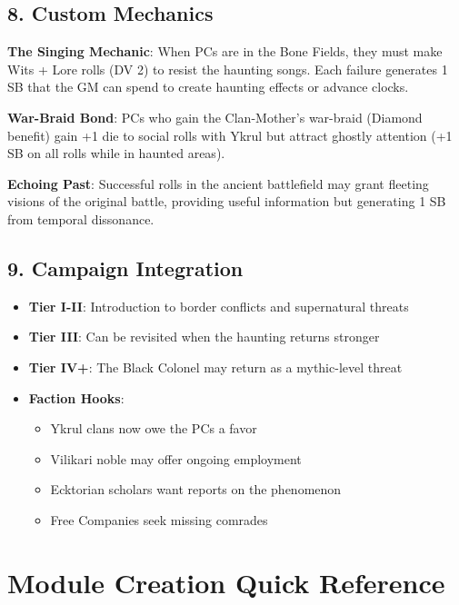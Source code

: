 \documentclass[11pt]{article}
\begin{document}
\subsection*{8. Custom Mechanics}

\begin{mdframed}[backgroundcolor=modulebg]
\textbf{The Singing Mechanic}: When PCs are in the Bone Fields, they must make Wits + Lore rolls (DV 2) to resist the haunting songs. Each failure generates 1 SB that the GM can spend to create haunting effects or advance clocks.

\textbf{War-Braid Bond}: PCs who gain the Clan-Mother's war-braid (Diamond benefit) gain +1 die to social rolls with Ykrul but attract ghostly attention (+1 SB on all rolls while in haunted areas).

\textbf{Echoing Past}: Successful rolls in the ancient battlefield may grant fleeting visions of the original battle, providing useful information but generating 1 SB from temporal dissonance.
\end{mdframed}

\subsection*{9. Campaign Integration}

\begin{itemize}[leftmargin=*]
\item \textbf{Tier I-II}: Introduction to border conflicts and supernatural threats
\item \textbf{Tier III}: Can be revisited when the haunting returns stronger
\item \textbf{Tier IV+}: The Black Colonel may return as a mythic-level threat
\item \textbf{Faction Hooks}: 
\begin{itemize}
\item Ykrul clans now owe the PCs a favor
\item Vilikari noble may offer ongoing employment
\item Ecktorian scholars want reports on the phenomenon
\item Free Companies seek missing comrades
\end{itemize}
\end{itemize}

\section*{Module Creation Quick Reference}
\end{document}
